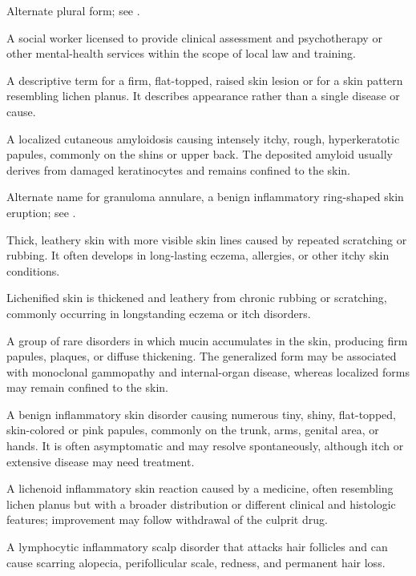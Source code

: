  Alternate plural form; see .

 A social worker licensed to provide clinical assessment and psychotherapy or other mental-health services within the scope of local law and training.

 A descriptive term for a firm, flat-topped, raised skin lesion or for a skin pattern resembling lichen planus. It describes appearance rather than a single disease or cause.

 A localized cutaneous amyloidosis causing intensely itchy, rough, hyperkeratotic papules, commonly on the shins or upper back. The deposited amyloid usually derives from damaged keratinocytes and remains confined to the skin.

 Alternate name for granuloma annulare, a benign inflammatory ring-shaped skin eruption; see .

 Thick, leathery skin with more visible skin lines caused by repeated scratching or rubbing. It often develops in long-lasting eczema, allergies, or other itchy skin conditions.

 Lichenified skin is thickened and leathery from chronic rubbing or scratching, commonly occurring in longstanding eczema or itch disorders.

 A group of rare disorders in which mucin accumulates in the skin, producing firm papules, plaques, or diffuse thickening. The generalized form may be associated with monoclonal gammopathy and internal-organ disease, whereas localized forms may remain confined to the skin.

 A benign inflammatory skin disorder causing numerous tiny, shiny, flat-topped, skin-colored or pink papules, commonly on the trunk, arms, genital area, or hands. It is often asymptomatic and may resolve spontaneously, although itch or extensive disease may need treatment.

 A lichenoid inflammatory skin reaction caused by a medicine, often resembling lichen planus but with a broader distribution or different clinical and histologic features; improvement may follow withdrawal of the culprit drug.

 A lymphocytic inflammatory scalp disorder that attacks hair follicles and can cause scarring alopecia, perifollicular scale, redness, and permanent hair loss.

